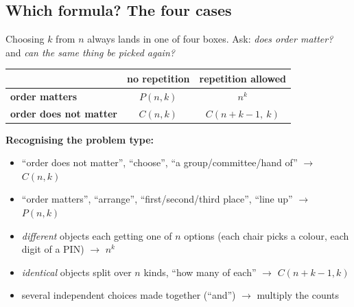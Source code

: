 \documentclass{fkt-notes}
\theoremstyle{definition}
\begin{document}
\subsection{Which formula? The four cases}\label{qg:count}
%
Choosing $k$ from $n$ always lands in one of four boxes. Ask:
\emph{does order matter?} and \emph{can the same thing be picked
  again?}

\begin{rulepar}
  \begin{center}
    \renewcommand{\arraystretch}{1.5}
    \begin{tabular}{@{}lcc@{}}
      \toprule
                                     & \textbf{no} repetition & repetition \textbf{allowed} \\
      \midrule
      \textbf{order matters}         & $P(n, k)$              & $n^k$                       \\
      \textbf{order does not matter} & $C(n, k)$              & $C(n + k - 1,\ k)$          \\
      \bottomrule
    \end{tabular}
  \end{center}
\end{rulepar}

\noindent \textbf{Recognising the problem type:}
\begin{itemize}[nosep]
  \item ``order does not matter'', ``choose'', ``a group/committee/hand
        of'' $\to$ $C(n, k)$
  \item ``order matters'', ``arrange'', ``first/second/third place'',
        ``line up'' $\to$ $P(n, k)$
  \item \emph{different} objects each getting one of $n$ options
        (each chair picks a colour, each digit of a PIN) $\to$ $n^k$
  \item \emph{identical} objects split over $n$ kinds, ``how many of
        each'' $\to$ $C(n + k - 1, k)$
  \item several independent choices made together (``and'')
        $\to$ multiply the counts
\end{itemize}

\end{document}
